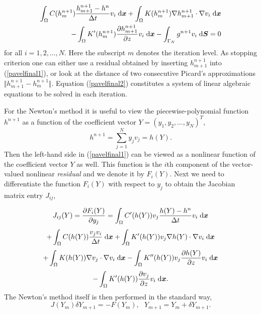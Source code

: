 \documentclass[final,3p,times,twocolumn]{elsarticle}
\newcommand{\bfx}{\mbox{\boldmath $x$}}
\newcommand{\bfS}{\mbox{\boldmath $S$}}
\begin{document}
\begin{equation}
\begin{split}
\int_{\Omega}  C(h_m^{n+1})\frac{h_{m+1}^{n+1} - h^n}{\Delta t}v_i \;{\rm
d}\bfx + \int_{\Omega} K(h_m^{n+1})\nabla h_{m+1}^{n+1} \cdot \nabla v_i \;{\rm
d}\bfx \\ - \int_{\Omega}K'(h_m^{n+1})\frac{\partial h_{m+1}^{n+1}}{\partial z}v_i \;{\rm
d}\bfx - \int_{\Gamma_N} g^{n+1} v_i \;{\rm d}\bfS = 0
\end{split}
\label{pavelfinal2}
\end{equation}
for all $i = 1, 2, \ldots, N$.
Here the subscript $m$ denotes the iteration level. As stopping criterion one can either 
use a residual obtained by inserting $h_{m+1}^{n+1}$ into (\ref{pavelfinal1}), or look at the 
distance of two consecutive Picard's approximations $\Vert h_{m+1}^{n+1} - h_{m}^{n+1} \Vert$.
Equation (\ref{pavelfinal2}) constitutes a system of linear algebraic equations to be solved
in each iteration.

For the Newton's method it is useful to view the piecewise-polynomial
function $h^{n+1}$ as a function of the coefficient vector $Y = (y_1, y_2, \ldots, y_N)^T$,
$$
h^{n+1} = \sum_{j=1}^N y_j v_j = h(Y).
$$
Then the left-hand side in (\ref{pavelfinal1}) can be viewed as a nonlinear 
function of the coefficient vector $Y$ as well. This function is the $i$th component 
of the vector-valued nonlinear {\em residual} and we denote it by $F_i(Y)$.
Next we need to differentiate the function $F_i(Y)$ with respect to $y_j$ to obtain 
the Jacobian matrix entry $J_{ij}$,

$$
J_{ij}(Y) = \frac{\partial F_i(Y)}{\partial y_j} 
= \int_{\Omega}  C'(h(Y))v_j\frac{h(Y) - h^n}{\Delta t}v_i \;{\rm d}\bfx 
$$
$$
+ \int_{\Omega}  C(h(Y))\frac{v_j v_i}{\Delta t} \;{\rm d}\bfx 
+ \int_{\Omega} K'(h(Y))v_j\nabla h(Y) \cdot \nabla v_i \;{\rm d}\bfx 
$$
$$
+ \int_{\Omega} K(h(Y))\nabla v_j \cdot \nabla v_i \;{\rm d}\bfx 
- \int_{\Omega}K''(h(Y))v_j\frac{\partial h(Y)}{\partial z}v_i \;{\rm d}\bfx 
$$
$$
- \int_{\Omega}K'(h(Y))\frac{\partial v_j}{\partial z}v_i \;{\rm d}\bfx. 
$$
The Newton's method itself is then performed in the standard way,
$$
J(Y_m) \delta Y_{m+1} = -F(Y_m), \ \ \ Y_{m+1} = Y_{m} + \delta Y_{m+1}.
$$
\end{document}
